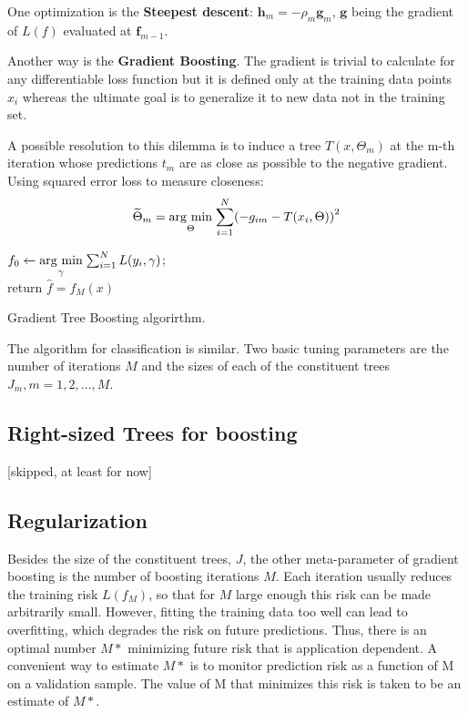 One optimization is the \textbf{Steepest descent}: $\mathbf{h}_m = -\rho_m \mathbf{g}_m$, $\mathbf{g}$ being the gradient of $L(f)$ evaluated at $\mathbf{f}_{m-1}$.

Another way is the \textbf{Gradient Boosting}. The gradient is trivial to calculate for any differentiable loss function but it is defined only at the training data points $x_i$ whereas the ultimate goal is to generalize it to new data not in the training set.

A possible resolution to this dilemma is to induce a tree $T(x, \Theta_m)$ at the m-th iteration whose predictions $t_m$  are as close as possible to the negative gradient. Using squared error loss to measure closeness:
\begin{equation}
\widetilde{\Theta}_m = \argmin{\Theta}{\sum_{i=1}^N \br{-g_{im}-T(x_i, \Theta)}^2}
\end{equation}
 \begin{algorithm}[!ht]
    $f_0\leftarrow \underset{\gamma}{\operatorname{arg}\,\operatorname{min}}\;{\sum_{i=1}^N L(y_i, \gamma)}$;\\
		return $\hat{f} = f_M(x)$
\caption{Gradient Tree Boosting algorirthm.}
\end{algorithm}
The algorithm for classification is similar. Two basic tuning parameters are the number of iterations $M$ and the sizes of each of the constituent trees $J_m, m=1,2,...,M$.

\subsection{Right-sized Trees for boosting}
[skipped, at least for now]

\subsection{Regularization}
Besides the size of the constituent trees, $J$, the other meta-parameter of gradient boosting is the number of boosting iterations $M$. Each iteration usually reduces the training risk $L(f_M )$, so that for $M$ large enough this risk can be made arbitrarily small. However, fitting the training data too well can lead to overfitting, which degrades the risk on future predictions. Thus, there is an optimal number $M*$ minimizing future risk that is application dependent. A convenient way to estimate $M*$ is to monitor prediction risk as a function of M on a validation sample. The value of M that minimizes this risk is taken to be an estimate of $M*$.
